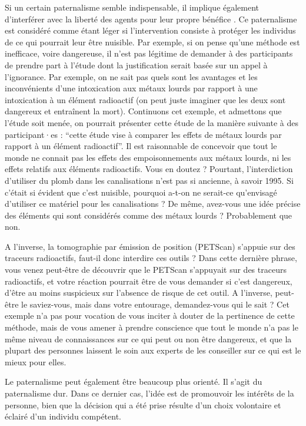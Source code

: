 \documentclass[
  12pt,
]{book}
\begin{document}
Si un certain paternalisme semble indispensable, il implique également d'interférer avec la liberté des agents pour leur propre bénéfice \citep{Feinberg1986}. Ce paternalisme est considéré comme étant léger si l'intervention consiste à protéger les individus de ce qui pourrait leur être nuisible. Par exemple, si on pense qu'une méthode est inefficace, voire dangereuse, il n'est pas légitime de demander à des participants de prendre part à l'étude dont la justification serait basée sur un appel à l'ignorance. Par exemple, on ne sait pas quels sont les avantages et les inconvénients d'une intoxication aux métaux lourds par rapport à une intoxication à un élément radioactif (on peut juste imaginer que les deux sont dangereux et entraînent la mort). Continuons cet exemple, et admettons que l'étude soit menée, on pourrait présenter cette étude de la manière suivante à des participant·es : ``cette étude vise à comparer les effets de métaux lourds par rapport à un élément radioactif''. Il est raisonnable de concevoir que tout le monde ne connait pas les effets des empoisonnements aux métaux lourds, ni les effets relatifs aux éléments radioactifs. Vous en doutez ? Pourtant, l'interdiction d'utiliser du plomb dans les canalisations n'est pas si ancienne, à savoir 1995. Si c'était si évident que c'est nuisible, pourquoi a-t-on ne serait-ce qu'envisagé d'utiliser ce matériel pour les canalisations ? De même, avez-vous une idée précise des éléments qui sont considérés comme des métaux lourds ? Probablement que non.

A l'inverse, la tomographie par émission de position (PETScan) s'appuie sur des traceurs radioactifs, faut-il donc interdire ces outils ? Dans cette dernière phrase, vous venez peut-être de découvrir que le PETScan s'appuyait sur des traceurs radioactifs, et votre réaction pourrait être de vous demander si c'est dangereux, d'être au moins suspicieux sur l'absence de risque de cet outil. A l'inverse, peut-être le saviez-vous, mais dans votre entourage, demandez-vous qui le sait ? Cet exemple n'a pas pour vocation de vous inciter à douter de la pertinence de cette méthode, mais de vous amener à prendre conscience que tout le monde n'a pas le même niveau de connaissances sur ce qui peut ou non être dangereux, et que la plupart des personnes laissent le soin aux experts de les conseiller sur ce qui est le mieux pour elles.

Le paternalisme peut également être beaucoup plus orienté. Il s'agit du paternalisme dur. Dans ce dernier cas, l'idée est de promouvoir les intérêts de la personne, bien que la décision qui a été prise résulte d'un choix volontaire et éclairé d'un individu compétent.
\end{document}
